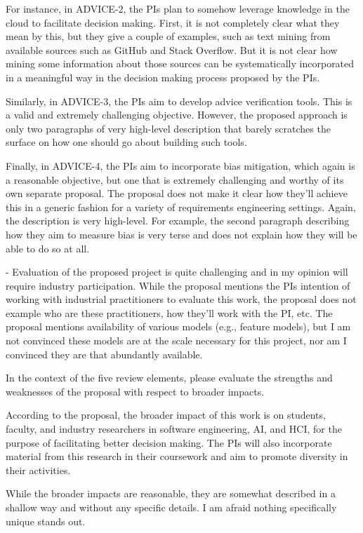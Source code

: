 For instance, in ADVICE-2, the PIs plan to somehow leverage knowledge in the cloud to facilitate decision making. First, it is not completely clear what they mean by this, but they give a couple of examples, such as text mining from available sources such as GitHub and Stack Overflow. But it is not clear how mining some information about those sources can be systematically incorporated in a meaningful way in the decision making process proposed by the PIs.

Similarly, in ADVICE-3, the PIs aim to develop advice verification tools. This is a valid and extremely challenging objective. However, the proposed approach is only two paragraphs of very high-level description that barely scratches the surface on how one should go about building such tools.

Finally, in ADVICE-4, the PIs aim to incorporate bias mitigation, which again is a reasonable objective, but one that is extremely challenging and worthy of its own separate proposal. The proposal does not make it clear how they'll achieve this in a generic fashion for a variety of requirements engineering settings. Again, the description is very high-level. For example, the second paragraph describing how they aim to measure bias is very terse and does not explain how they will be able to do so at all.

- Evaluation of the proposed project is quite challenging and in my opinion will require industry participation. While the proposal mentions the PIs intention of working with industrial practitioners to evaluate this work, the proposal does not example who are these practitioners, how they'll work with the PI, etc. The proposal mentions availability of various models (e.g., feature models), but I am not convinced these models are at the scale necessary for this project, nor am I convinced they are that abundantly available.

In the context of the five review elements, please
evaluate the strengths and weaknesses of the proposal with respect to broader impacts.

According to the proposal, the broader impact of this work is on students, faculty, and industry researchers in software engineering, AI, and HCI, for the purpose of facilitating better decision making. The PIs will also incorporate material from this research in their coursework and aim to promote diversity in their activities.

While the broader impacts are reasonable, they are somewhat described in a shallow way and without any specific details. I am afraid nothing specifically unique stands out.

